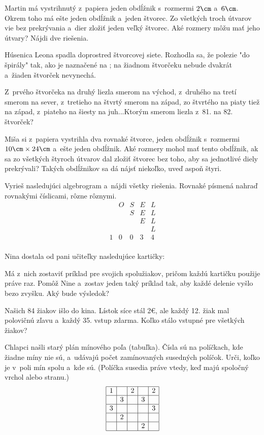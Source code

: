 {%
Martin má vystrihnutý z~papiera jeden obdĺžnik s~rozmermi $2\cm$ a~$6\cm$. Okrem toho má ešte jeden obdĺžnik a~jeden štvorec. Zo všetkých troch útvarov vie bez prekrývania a~dier zložiť jeden veľký štvorec. Aké rozmery môžu mať jeho útvary? Nájdi dve riešenia.}

{%
Húsenica Leona spadla doprostred štvorcovej siete. Rozhodla sa, že polezie "do špirály" tak, ako je naznačené na \obr{}; na žiadnom štvorčeku nebude dvakrát a~žiaden štvorček nevynechá.
%

Z~prvého štvorčeka na druhý liezla smerom na východ, z~druhého na tretí smerom na sever, z~tretieho na štvrtý smerom na západ, zo štvrtého na piaty tiež na západ, z~piateho na šiesty na juh...Ktorým smerom liezla z~81. na 82. štvorček?
}

{%
Miša si z~papiera vystrihla dva rovnaké štvorce, jeden obdĺžnik s~rozmermi $10\cm\times24\cm$ a~ešte jeden obdĺžnik. Aké rozmery mohol mať tento obdĺžnik, ak sa zo všetkých štyroch útvarov dal zložiť štvorec bez toho, aby sa jednotlivé diely prekrývali? Takých obdĺžnikov sa dá nájsť niekoľko, uveď aspoň štyri.}

{%
Vyrieš nasledujúci algebrogram a~nájdi všetky riešenia. Rovnaké písmená nahraď rovnakými číslicami, rôzne rôznymi.
$$
\begin{array}{ccccc}
 & O & S & E & L \\
 & & S & E & L \\
 & & & E & L \\
 & & & & L \\
\hline
1 & 0 & 0 & 3 & 4 \\
\end{array}
$$}

{%
Nina dostala od pani učiteľky nasledujúce kartičky:
%

Má z~nich zostaviť príklad pre svojich spolužiakov, pričom každú kartičku použije práve raz. Pomôž Nine a~zostav jeden taký príklad tak, aby každé delenie vyšlo bezo zvyšku. Aký bude výsledok?
}

{%
Našich 84 žiakov išlo do kina. Lístok síce stál 2€, ale každý 12. žiak mal polovičnú zľavu a~každý 35. vstup zdarma. Koľko stálo vstupné pre všetkých žiakov?}

{%
Chlapci našli starý plán mínového poľa (tabuľka). Čísla sú na políčkach, kde žiadne míny nie sú, a~udávajú počet zamínovaných susedných políčok. Urči, koľko je v~poli mín spolu a~kde sú. (Políčka susedia práve vtedy, keď majú spoločný vrchol alebo stranu.)
$$
\begin{array}{|c|c|c|c|c|c|}
\hline
 1 &  & 2 &  & 2 \\
\hline
  & 3 &  & 3 &  \\
\hline
  3 &  &  &  & 3 \\
\hline
   & 2 &  &  &  \\
\hline
   &  &  & 2 &  \\
\hline
\end{array}
$$}

